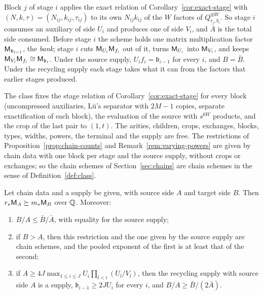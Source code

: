 Block \(j\) of stage \(i\) applies the exact relation of
Corollary~\ref{cor:exact-stage} with \((N,k,\tau)=(N_{ij},k_{ij},\tau_{ij})\)
to its own \(N_{ij}k_{ij}\) of the \(W\) factors of
\(Q_{r_i,b_i}^{\otimes W}\). So stage \(i\) consumes an auxiliary of side
\(U_i\) and produces one of side \(V_i\), and \(\bar A\) is the total side
consumed. Before stage \(i\) the scheme holds one matrix multiplication
factor \(\mathsf M_{\mathfrak b_{i-1}}\), the \emph{bank}; stage \(i\) cuts
\(\mathsf M_{U_i}\mathsf M_{f_i}\) out of it, turns \(\mathsf M_{U_i}\) into
\(\mathsf M_{V_i}\), and keeps \(\mathsf M_{V_i}\mathsf M_{f_i}\cong\mathsf M_{\mathfrak b_i}\). Under
the source supply, \(U_if_i=\mathfrak b_{i-1}\) for every \(i\), and
\(B=\bar B\). Under the recycling supply each stage takes what it can
from the factors that earlier stages produced.

The class fixes the stage relation of Corollary~\ref{cor:exact-stage}
for every block (uncompressed auxiliaries, Lü's separator with \(2M-1\)
copies, separate exactification of each block), the evaluation of the
source with \(s^{6W}\) products, and the crop of the last pair to
\((1,t)\). The arities, children, crops, exchanges, blocks, types, widths,
powers, the terminal and the supply are free. The restrictions of
Proposition~\ref{prop:chain-counts} and Remark~\ref{rem:varying-powers}
are given by chain data with one block per stage and the source supply,
without crops or exchanges; so the chain schemes of
Section~\ref{sec:chains} are chain schemes in the sense of
Definition~\ref{def:class}.

\begin{lemma}\label{lem:recycling}
Let chain data and a supply be given, with source side \(A\) and target
side \(B\). Then \(r_*\mathsf M_A\succeq m_*\mathsf M_B\) over \(\mathbb Q\). Moreover:
\begin{enumerate}
\item[(a)] \(B/A\le\bar B/\bar A\), with equality for the source supply;
\item[(b)] if \(B>A\), then this restriction and the one given by the
source supply are chain schemes, and the pooled exponent of the first is
at least that of the second;
\item[(c)] if \(A\ge4J\max_{1\le i\le J}U_i\prod_{l<i}(U_l/V_l)\), then
the recycling supply with source side \(A\) is a supply,
\(\mathfrak b_{i-1}\ge2JU_i\) for every \(i\), and \(B/A\ge\bar B/(2\bar A)\).
\end{enumerate}
\end{lemma}


